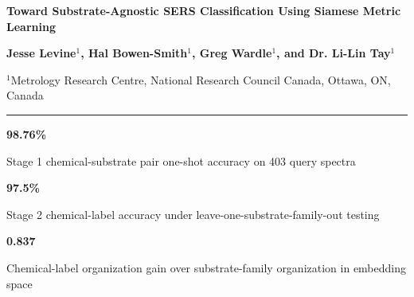 \documentclass[final]{article}
\newcommand{\bodytext}{\fontsize{16.4}{19.5}\selectfont}
\newcommand{\smalltext}{\fontsize{11.8}{14.0}\selectfont}
\newcommand{\metric}[2]{%
  \begin{minipage}[t]{0.30\linewidth}
  \centering
  {\fontsize{31}{35}\selectfont\bfseries\color{posteraccent}#1}\par
  {\smalltext #2}
  \end{minipage}
}
\begin{document}
\bodytext

\begin{center}
{\fontsize{45}{50}\selectfont\bfseries\color{posterprimary}Toward Substrate-Agnostic SERS Classification Using Siamese Metric Learning}\par
\vspace{0.055in}
{\fontsize{21}{25}\selectfont\bfseries\color{posterink}Jesse Levine$^{1}$, Hal Bowen-Smith$^{1}$, Greg Wardle$^{1}$, and Dr. Li-Lin Tay$^{1}$}\par
\vspace{0.02in}
{\fontsize{15.5}{19}\selectfont\color{posterink}$^{1}$Metrology Research Centre, National Research Council Canada, Ottawa, ON, Canada}
\end{center}

\vspace{0.04in}
{\color{posterprimary}\rule{\linewidth}{0.07in}}
\vspace{0.015in}

\begin{center}
\metric{98.76\%}{Stage 1 chemical-substrate pair one-shot accuracy on 403 query spectra}
\hfill
\metric{97.5\%}{Stage 2 chemical-label accuracy under leave-one-substrate-family-out testing}
\hfill
\metric{0.837}{Chemical-label organization gain over substrate-family organization in embedding space}
\end{center}

\vspace{0.035in}
\end{document}
